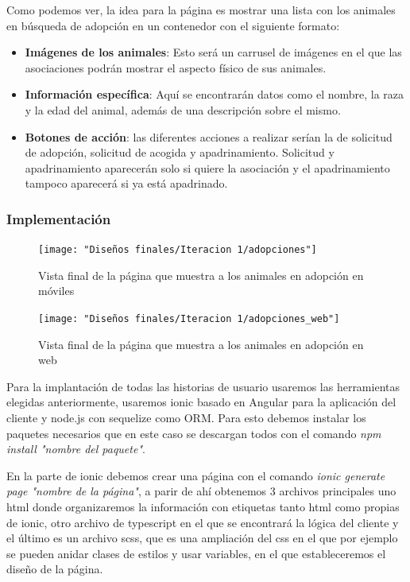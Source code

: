 Como podemos ver, la idea para la página es mostrar una lista con los animales en búsqueda de adopción en un contenedor con el siguiente formato:

\begin{itemize}
	\item \textbf{Imágenes de los animales}: Esto será un carrusel de imágenes en el que las asociaciones podrán mostrar el aspecto físico de sus animales.
	\item \textbf{Información específica}: Aquí se encontrarán datos como el nombre, la raza y la edad del animal, además de una descripción sobre el mismo.
	\item \textbf{Botones de acción}: las diferentes acciones a realizar serían la de solicitud de adopción, solicitud de acogida y apadrinamiento. Solicitud y apadrinamiento aparecerán solo si quiere la asociación y el apadrinamiento tampoco aparecerá si ya está apadrinado.
\end{itemize}

\subsubsection{Implementación} %

\begin{figure}[H]
	\centering
	\texttt{[image: "Diseños finales/Iteracion 1/adopciones"]}
	\caption{Vista final de la página que muestra a los animales en adopción en móviles}
	\label{fig:adopcionesDef}
\end{figure}


\begin{figure}[H]
	\centering
	\texttt{[image: "Diseños finales/Iteracion 1/adopciones\_web"]}
	\caption{Vista final de la página que muestra a los animales en adopción en web}
	\label{fig:adopcionesDefWeb}
\end{figure}
Para la implantación de todas las historias de usuario usaremos las herramientas elegidas anteriormente, usaremos ionic basado en Angular para la aplicación del cliente y node.js con sequelize como ORM. Para esto debemos instalar los paquetes necesarios que en este caso se descargan todos con el comando \textit{npm install "nombre del paquete"}.

En la parte de ionic debemos crear una página con el comando \textit{ionic generate page "nombre de la página"}, a parir de ahí obtenemos 3 archivos principales uno html donde organizaremos la información con etiquetas tanto html como propias de ionic, otro archivo de typescript en el que se encontrará la lógica del cliente y el último es un archivo scss, que es una ampliación del css en el que por ejemplo se pueden anidar clases de estilos y usar variables, en el que estableceremos el diseño de la página.

